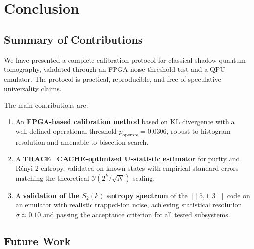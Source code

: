 \documentclass[12pt,a4paper,oneside]{book}
\theoremstyle{plain}
\theoremstyle{definition}
\theoremstyle{remark}
\begin{document}
\chapter{Conclusion}
\label{chap:conclusion}

\section{Summary of Contributions}
\label{sec:conc_summary}

We have presented a complete calibration protocol for classical-shadow quantum tomography, validated through an FPGA noise-threshold test and a QPU emulator. The protocol is practical, reproducible, and free of speculative universality claims.

The main contributions are:
\begin{enumerate}
    \item An \textbf{FPGA-based calibration method} based on KL divergence with a well-defined operational threshold $p_{\text{operate}} = 0.0306$, robust to histogram resolution and amenable to bisection search.
    \item A \textbf{TRACE\_CACHE-optimized U-statistic estimator} for purity and R\'enyi-2 entropy, validated on known states with empirical standard errors matching the theoretical $\mathcal{O}(2^k/\sqrt{N})$ scaling.
    \item A \textbf{validation of the $S_2(k)$ entropy spectrum} of the $[[5,1,3]]$ code on an emulator with realistic trapped-ion noise, achieving statistical resolution $\sigma \approx 0.10$ and passing the acceptance criterion for all tested subsystems.
\end{enumerate}

\section{Future Work}
\label{sec:conc_future}
\end{document}
